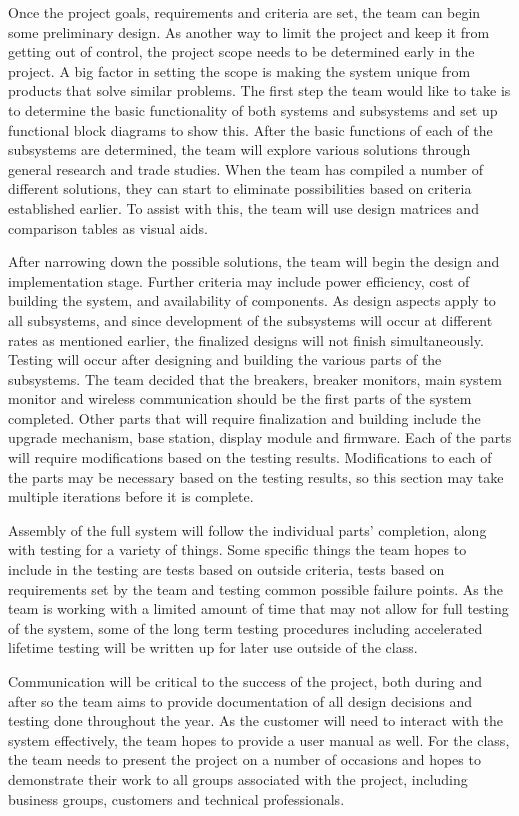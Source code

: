 Once the project goals, requirements and criteria are set, the team can begin some preliminary design. As another way to limit the project and keep it from getting out of control, the project scope needs to be determined early in the project. A big factor in setting the scope is making the system unique from products that solve similar problems. The first step the team would like to take is to determine the basic functionality of both systems and subsystems and set up functional block diagrams to show this. After the basic functions of each of the subsystems are determined, the team will explore various solutions through general research and trade studies. When the team has compiled a number of different solutions, they can start to eliminate possibilities based on criteria established earlier. To assist with this, the team will use design matrices and comparison tables as visual aids.

After narrowing down the possible solutions, the team will begin the design and implementation stage. Further criteria may include power efficiency, cost of building the system, and availability of components. As  design aspects apply to all subsystems, and since development of the subsystems will occur at different rates as mentioned earlier, the finalized designs will not finish simultaneously. Testing will occur after designing and building the various parts of the subsystems. The team decided that the breakers, breaker monitors, main system monitor and wireless communication should be the first parts of the system completed. Other parts that will require finalization and building include the upgrade mechanism, base station, display module and firmware. Each of the parts will require modifications based on the testing results. Modifications to each of the parts may be necessary based on the testing results, so this section may take multiple iterations before it is complete.

Assembly of the full system will follow the individual parts' completion, along with testing for a variety of things. Some specific things the team hopes to include in the testing are tests based on outside criteria, tests based on requirements set by the team and testing common possible failure points. As the team is working with a limited amount of time that may not allow for full testing of the system, some of the long term testing procedures including accelerated lifetime testing will be written up for later use outside of the class.

Communication will be critical to the success of the project, both during and after so the team aims to provide documentation of all design decisions and testing done throughout the year. As the customer will need to interact with the system effectively, the team hopes to provide a user manual as well. For the class, the team needs to present the project on a number of occasions and hopes to demonstrate their work to all groups associated with the project, including business groups, customers and technical professionals.


